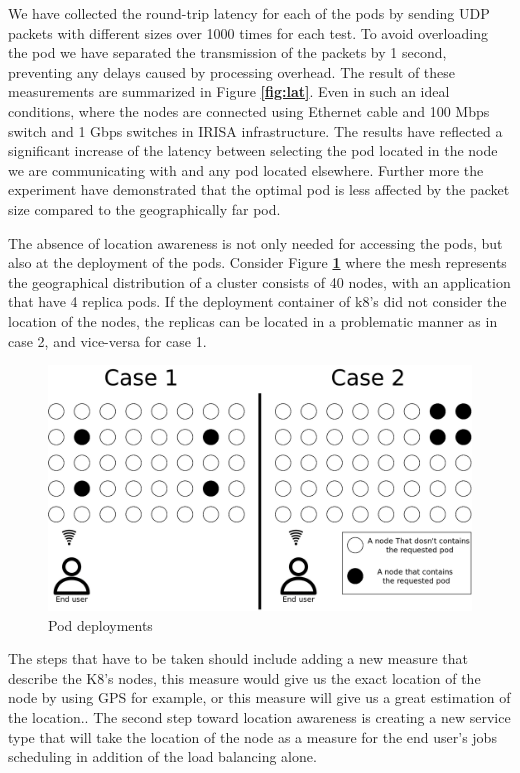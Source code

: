 \documentclass[letterpaper,twocolumn,10pt]{article}
\let\origref\ref
\def\ref#1{\textbf{\origref{#1}}}
\begin{document}
We have collected the round-trip latency for each of the pods by sending UDP packets with different sizes over 1000 times for each test. To avoid overloading the pod we have separated the transmission of the packets by 1 second, preventing any delays caused by processing overhead. The result of these measurements are summarized in Figure \ref{fig:lat}. Even in such an ideal conditions, where the nodes are connected using Ethernet cable and 100 Mbps switch and 1 Gbps switches in IRISA infrastructure. The results have reflected a significant increase of the latency between selecting the pod located in the node we are communicating with and any pod located elsewhere. Further more the experiment have demonstrated that the optimal pod is less affected by the packet size compared to the geographically far pod. 


The absence of location awareness is not only needed for accessing the pods, but also at the deployment of the pods. Consider Figure \ref{fig:dep} where the mesh represents the geographical distribution of a cluster consists of 40 nodes, with an application that have 4 replica pods. If the deployment container of k8's did not consider the location of the nodes, the replicas can be located in a problematic manner as in case 2, and vice-versa for case 1. 

\begin{figure}[th]
\centering\includegraphics[width=.5\textwidth]{images/dep.png}
\caption{Pod deployments}
\label{fig:dep}
\end{figure}


The steps that have to be taken should include adding a new measure that describe the K8's nodes, this measure would give us the exact location of the node by using GPS for example, or this measure will give us a great estimation of the location.. 
The second step toward location awareness is creating a new service type that will take the location of the node as a measure for the end user's jobs scheduling in addition of the load balancing alone.
\end{document}
